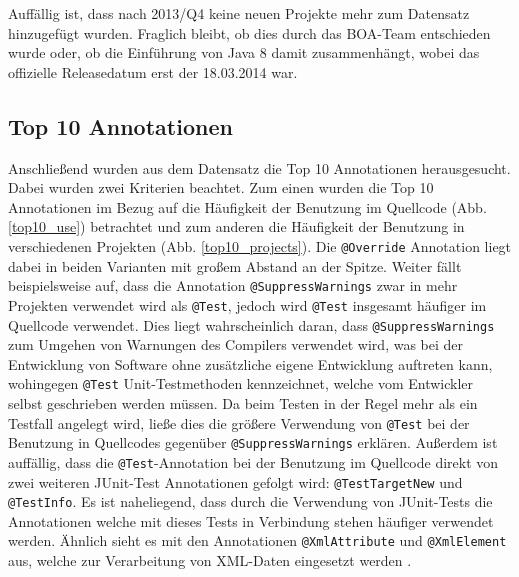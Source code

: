 \documentclass[11pt,a4paper,parskip=full]{scrartcl}
\begin{document}
Auffällig ist, dass nach 2013/Q4 keine neuen Projekte mehr zum Datensatz hinzugefügt wurden. Fraglich bleibt, ob dies durch das BOA-Team entschieden wurde oder, ob die Einführung von Java 8 damit zusammenhängt, wobei das offizielle Releasedatum erst der 18.03.2014 war.

\subsection{Top 10 Annotationen}

Anschließend wurden aus dem Datensatz die Top 10 Annotationen herausgesucht. Dabei wurden zwei Kriterien beachtet. Zum einen wurden die Top 10 Annotationen im Bezug auf die Häufigkeit der Benutzung im Quellcode (Abb. \ref{top10_use}) betrachtet und zum anderen die Häufigkeit der Benutzung in verschiedenen Projekten (Abb. \ref{top10_projects}). Die \texttt{@Override} Annotation liegt dabei in beiden Varianten mit großem Abstand an der Spitze. Weiter fällt beispielsweise auf, dass die Annotation \texttt{@SuppressWarnings} zwar
in mehr Projekten verwendet wird als \texttt{@Test}, jedoch wird \texttt{@Test} insgesamt häufiger im Quellcode verwendet. Dies liegt wahrscheinlich daran, dass \texttt{@SuppressWarnings} zum Umgehen von Warnungen des Compilers verwendet wird, was bei der Entwicklung von Software ohne zusätzliche eigene Entwicklung auftreten kann, wohingegen \texttt{@Test} Unit-Testmethoden kennzeichnet, welche vom Entwickler selbst geschrieben werden müssen. Da beim Testen in der Regel mehr als ein Testfall angelegt wird, ließe dies die größere Verwendung von  \texttt{@Test} bei der Benutzung in Quellcodes gegenüber \texttt{@SuppressWarnings} erklären. Außerdem ist auffällig, dass die \texttt{@Test}-Annotation bei der Benutzung im Quellcode direkt von zwei weiteren JUnit-Test Annotationen gefolgt wird: \texttt{@TestTargetNew} und \texttt{@TestInfo}. Es ist naheliegend, dass durch die Verwendung von JUnit-Tests die Annotationen welche mit dieses Tests in Verbindung stehen häufiger verwendet werden. Ähnlich sieht es mit den Annotationen \texttt{@XmlAttribute} und \texttt{@XmlElement} aus, welche zur Verarbeitung von XML-Daten eingesetzt werden \cite{xml}.
\end{document}

